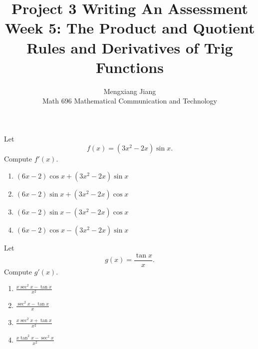 \documentclass[12pt]{article}
\newenvironment{problem}[2][Problem]{\begin{trivlist}
\item[\hskip \labelsep {\bfseries #1}\hskip \labelsep {\bfseries #2.}]}
{\end{trivlist}}
\begin{document}
 
 
\title{Project 3 Writing An Assessment
\\ Week 5: The Product and Quotient Rules and Derivatives of Trig Functions}
\author{Mengxiang Jiang\\ %
Math 696 Mathematical Communication and Technology} %
 
\maketitle
 
\begin{problem}{1} %
Let
\[
  f(x) = (3x^2 - 2x)\sin x.
\]
Compute $f'(x)$.

\begin{enumerate}
  \item $(6x - 2)\cos x +(3x^2 - 2x)\sin x$
  \item $(6x - 2)\sin x +(3x^2 - 2x)\cos x$
  \item $(6x - 2)\sin x -(3x^2 - 2x)\cos x$
  \item $(6x - 2)\cos x -(3x^2 - 2x)\sin x$
\end{enumerate}
\end{problem}

\begin{problem}{2}
Let
\[
  g(x) = \frac{\tan x}{x}.
\]
Compute $g'(x)$.

\begin{enumerate}
  \item $\displaystyle \frac{x\sec^2 x -\tan x}{x^2}$
  \item $\displaystyle \frac{\sec^2 x -\tan x}{x}$
  \item $\displaystyle \frac{x\sec^2 x +\tan x}{x^2}$
  \item $\displaystyle \frac{x\tan^2 x -\sec^2 x}{x^2}$
\end{enumerate}
\end{problem}

\pagebreak
\end{document}
